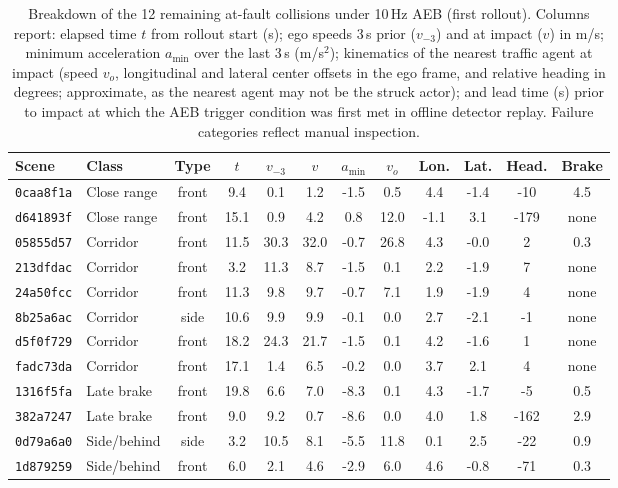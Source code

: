\begin{table}[!htb]
\centering\tiny
\caption{Breakdown of the 12 remaining at-fault collisions under 10\,Hz AEB (first rollout). Columns report: elapsed time $t$ from rollout start (s); ego speeds 3\,s prior ($v_{-3}$) and at impact ($v$) in m/s; minimum acceleration $a_\mathrm{min}$ over the last 3\,s (m/s$^2$); kinematics of the nearest traffic agent at impact (speed $v_o$, longitudinal and lateral center offsets in the ego frame, and relative heading in degrees; approximate, as the nearest agent may not be the struck actor); and lead time (s) prior to impact at which the AEB trigger condition was first met in offline detector replay. Failure categories reflect manual inspection.}
\label{tab:app_hits}
\begin{tabular}{llcccccccccc}
\toprule
Scene & Class & Type & $t$ & $v_{-3}$ & $v$ & $a_\mathrm{min}$ & $v_o$ & Lon. & Lat. & Head. & Brake \\
\midrule
\texttt{0caa8f1a} & Close range & front & 9.4 & 0.1 & 1.2 & -1.5 & 0.5 & 4.4 & -1.4 & -10 & 4.5 \\
\texttt{d641893f} & Close range & front & 15.1 & 0.9 & 4.2 & 0.8 & 12.0 & -1.1 & 3.1 & -179 & none \\
\texttt{05855d57} & Corridor & front & 11.5 & 30.3 & 32.0 & -0.7 & 26.8 & 4.3 & -0.0 & 2 & 0.3 \\
\texttt{213dfdac} & Corridor & front & 3.2 & 11.3 & 8.7 & -1.5 & 0.1 & 2.2 & -1.9 & 7 & none \\
\texttt{24a50fcc} & Corridor & front & 11.3 & 9.8 & 9.7 & -0.7 & 7.1 & 1.9 & -1.9 & 4 & none \\
\texttt{8b25a6ac} & Corridor & side & 10.6 & 9.9 & 9.9 & -0.1 & 0.0 & 2.7 & -2.1 & -1 & none \\
\texttt{d5f0f729} & Corridor & front & 18.2 & 24.3 & 21.7 & -1.5 & 0.1 & 4.2 & -1.6 & 1 & none \\
\texttt{fadc73da} & Corridor & front & 17.1 & 1.4 & 6.5 & -0.2 & 0.0 & 3.7 & 2.1 & 4 & none \\
\texttt{1316f5fa} & Late brake & front & 19.8 & 6.6 & 7.0 & -8.3 & 0.1 & 4.3 & -1.7 & -5 & 0.5 \\
\texttt{382a7247} & Late brake & front & 9.0 & 9.2 & 0.7 & -8.6 & 0.0 & 4.0 & 1.8 & -162 & 2.9 \\
\texttt{0d79a6a0} & Side/behind & side & 3.2 & 10.5 & 8.1 & -5.5 & 11.8 & 0.1 & 2.5 & -22 & 0.9 \\
\texttt{1d879259} & Side/behind & front & 6.0 & 2.1 & 4.6 & -2.9 & 6.0 & 4.6 & -0.8 & -71 & 0.3 \\
\bottomrule
\end{tabular}
\end{table}

